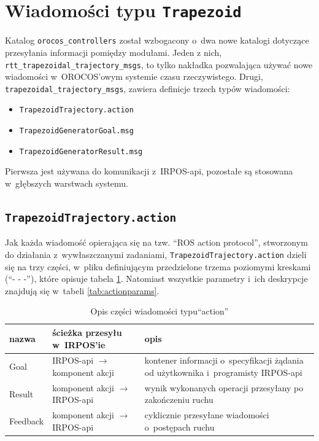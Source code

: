 \documentclass[a4paper, 12pt]{article}
\begin{document}
	\section{Wiadomości typu \texttt{Trapezoid}}
	\label{sec:msgs}
	Katalog \texttt{orocos\_controllers} został wzbogacony o~dwa nowe katalogi dotyczące przesyłania informacji pomiędzy modułami. Jeden z nich, \texttt{rtt\_trapezoidal\_trajectory\_msgs}, to tylko nakładka pozwalająca używać nowe wiadomości w~OROCOS'owym systemie czasu rzeczywistego. Drugi, \texttt{trapezoidal\_trajectory\_msgs}, zawiera definicje trzech typów wiadomości: 
	\begin{itemize}
	\item \texttt{TrapezoidTrajectory.action}
	\item \texttt{TrapezoidGeneratorGoal.msg}
	\item \texttt{TrapezoidGeneratorResult.msg}
	\end{itemize}
	Pierwsza jest używana do komunikacji z~IRPOS-api, pozostałe są stosowana w~głębszych warstwach systemu. 
	\subsection{\texttt{TrapezoidTrajectory.action}}
	\label{sec:msgsact}
	Jak każda wiadomość opierająca się na tzw. \textquotedblleft ROS action protocol\textquotedblright, stworzonym do działania z~wywłaszczanymi zadaniami\cite{ROS}, \texttt{TrapezoidTrajectory.action} dzieli się na trzy części, w~pliku definiującym przedzielone trzema poziomymi kreskami (\textquotedblleft - - -\textquotedblright), które opisuje tabela  \ref{tab:action}. Natomiast wszystkie parametry i~ich deskrypcje znajdują się w~tabeli \ref{tab:actionparams}.
	

	\begin{table}[H]
	\label{tab:action}
	\centering
	\begin{tabular}{|m{4em}|m{15em}|m{18em}|}
	 \hline
	 nazwa & ścieżka przesyłu w~IRPOS'ie & opis\\
	 \hline
	 \hline
	 Goal & IRPOS-api $\rightarrow$ komponent akcji & kontener informacji o~specyfikacji żądania od użytkownika i~programisty IRPOS-api \\  
	 \hline
	 Result & komponent akcji $\rightarrow$ IRPOS-api & wynik wykonanych operacji przesyłany  po zakończeniu ruchu \\
	 \hline
	 Feedback & komponent akcji $\rightarrow$ IRPOS-api  & cyklicznie przesyłane wiadomości o~postępach ruchu \\
	 \hline
	\end{tabular}
	\caption{Opis części wiadomości typu\textquotedblleft action\textquotedblright}
	\end{table}
	
\end{document}
